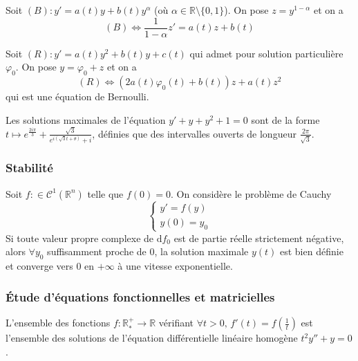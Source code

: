 
  \begin{application}
    Soit $(B) : y' = a(t) y + b(t) y^\alpha$ (où $\alpha \in \mathbb{R} \setminus \{0,1\}$). On pose $z=y^{1-\alpha}$ et on a
    \[ (B) \iff \frac{1}{1-\alpha} z' = a(t)z + b(t) \]
  \end{application}

  \begin{corollary}
    Soit $(R) : y' = a(t) y^2 + b(t) y + c(t)$ qui admet pour solution particulière $\varphi_0$. On pose $y = \varphi_0 + z$ et on a
    \[ (R) \iff (2a(t) \varphi_0(t) + b(t))z + a(t)z^2 \]
    qui est une équation de Bernoulli.
  \end{corollary}

  \begin{example}
    Les solutions maximales de l'équation $y' + y + y^2 + 1 = 0$ sont de la forme $t \mapsto e^{\frac{2i\pi}{3}} + \frac{\sqrt{3}}{e^{i (\sqrt{3}t+\theta)} + i}$, définies que des intervalles ouverts de longueur $\frac{2 \pi}{\sqrt{3}}$.
  \end{example}

  \subsubsection{Stabilité}


  \begin{application}
    Soit $f : \in \mathcal{C}^1(\mathbb{R}^n)$ telle que $f(0) = 0$. On considère le problème de Cauchy
    \[ \begin{cases} y'=f(y) \\ y(0) = y_0 \end{cases} \]
    Si toute valeur propre complexe de $\mathrm{d}f_0$ est de partie réelle strictement négative, alors $\forall y_0$ suffisamment proche de $0$, la solution maximale $y(t)$ est bien définie et converge vers $0$ en $+ \infty$ à une vitesse exponentielle.
  \end{application}

  \subsubsection{Étude d'équations fonctionnelles et matricielles}


  \begin{application}
    L'ensemble des fonctions $f : \mathbb{R}^+_* \rightarrow \mathbb{R}$ vérifiant $\forall t > 0, \, f'(t) = f \left( \frac{1}{t} \right)$ est l'ensemble des solutions de l'équation différentielle linéaire homogène $t^2 y'' + y = 0$.
  \end{application}


